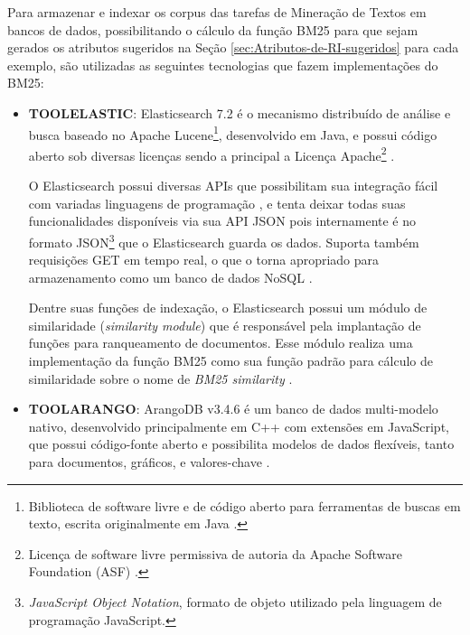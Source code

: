     Para armazenar e indexar os corpus das tarefas de Mineração de Textos em bancos de dados, possibilitando o cálculo da função BM25 para que sejam gerados os atributos sugeridos na Seção \ref{sec:Atributos-de-RI-sugeridos} para cada exemplo, são utilizadas as seguintes tecnologias que fazem implementações do BM25:
    \begin{itemize}
        \item \textbf{TOOL\underscore{}ELASTIC}: Elasticsearch 7.2 é o mecanismo distribuído de análise e busca baseado no Apache Lucene\footnote{Biblioteca de software livre e de código aberto para ferramentas de buscas em texto, escrita originalmente em Java \cite{LUCENE_DOCUMENTATION_2019}.}, desenvolvido em Java, e possui código aberto sob diversas licenças sendo a principal a Licença Apache\footnote{Licença de software livre permissiva de autoria da Apache Software Foundation (ASF) \cite{NEWMEDIA_OPENGUIDE_2015}.} \cite{ELASTIC_GitHub_2019, ELASTIC_REFERENCE_INTRO_2019}.  %
        
        O Elasticsearch possui diversas APIs que possibilitam sua integração fácil com variadas linguagens de programação \cite{ELASTIC_GitHub_2019}, e tenta deixar todas suas funcionalidades disponíveis via sua API JSON pois internamente é no formato JSON\footnote{\textit{JavaScript Object Notation}, formato de objeto utilizado pela linguagem de programação JavaScript.} que o Elasticsearch guarda os dados. 
        Suporta também requisições GET em tempo real, o que o torna apropriado para armazenamento como um banco de dados NoSQL \cite{PETER_ELASTICDB_2011, VOLKAN_ELASTIC_DATASTORE_2018}.
        
        Dentre suas funções de indexação, o Elasticsearch possui um módulo de similaridade (\textit{similarity module}) que é responsável pela implantação de funções para ranqueamento de documentos.
        Esse módulo realiza uma implementação da função BM25 como sua função padrão para cálculo de similaridade sobre o nome de \textit{BM25 similarity} \cite{ELASTIC_REFERENCE_SIMILARITY_2019}.
        
        \item \textbf{TOOL\underscore{}ARANGO}: ArangoDB v3.4.6 é um banco de dados multi-modelo nativo, desenvolvido principalmente em C++ com extensões em JavaScript, que possui código-fonte aberto e possibilita modelos de dados flexíveis, tanto para documentos, gráficos, e valores-chave \cite{ARANGODB_DOC_2019, ARANGODB_GitHub_2019}.
        

\end{itemize}
